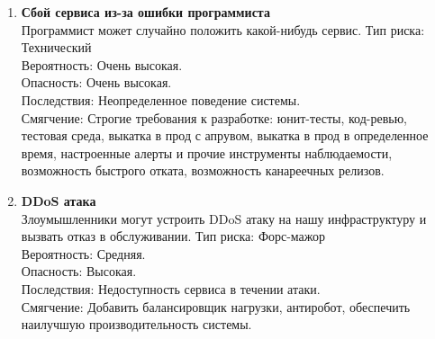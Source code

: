 \begin{enumerate}
      \item \textbf{Сбой сервиса из-за ошибки программиста} \\
            Программист может случайно положить какой-нибудь сервис.
            Тип риска: Технический \\
            Вероятность: Очень высокая. \\
            Опасность: Очень высокая. \\
            Последствия: Неопределенное поведение системы. \\
            Смягчение: Строгие требования к разработке: 
            юнит-тесты, код-ревью, тестовая среда, выкатка в прод с апрувом,
            выкатка в прод в определенное время, настроенные алерты и прочие 
            инструменты наблюдаемости, возможность быстрого отката,
            возможность канареечных релизов.

      \item \textbf{DDoS атака} \\
            Злоумышленники могут устроить DDoS атаку на нашу инфраструктуру и 
            вызвать отказ в обслуживании.
            Тип риска: Форс-мажор \\
            Вероятность: Средняя. \\
            Опасность: Высокая. \\
            Последствия: Недоступность сервиса в течении атаки. \\
            Смягчение: Добавить балансировщик нагрузки, антиробот, 
            обеспечить наилучшую производительность системы.

\end{enumerate}
